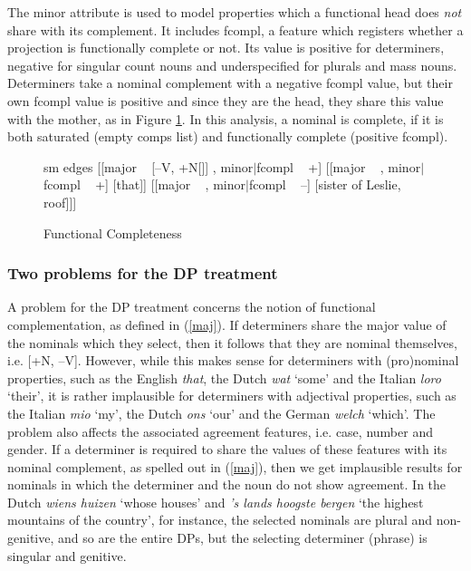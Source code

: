 \documentclass[output=paper]{langsci/langscibook}
\begin{document}
The {\sc minor} attribute is used to model properties which a functional head does {\em not} share with its 
complement. It includes {\sc fcompl}, a feature which registers whether a projection is 
functionally complete or not. Its value is positive for determiners, negative for  
singular count nouns and underspecified for plurals and mass nouns.  
Determiners take a nominal complement with a negative {\sc fcompl} value, but their 
own {\sc fcompl} value is positive and since they are the head, they share this value with 
the mother, as in Figure \ref{netter}. 
In this analysis, a nominal is complete, if it is both saturated 
(empty {\sc comps} list) and functionally complete (positive {\sc fcompl}). 

\begin{figure}
	\centering
	\begin{forest}
sm edges
[{[{\sc major} ~  [--V, +N[]] , {\sc minor$|$fcompl} ~ +]}
		[{[{\sc major} ~  , {\sc minor$|$fcompl} ~ +]} [that]]
		[{[{\sc major} ~  , {\sc minor$|$fcompl} ~ --]} [sister of Leslie, roof]]]
	\end{forest}
	\caption{\label{netter} Functional Completeness }
\end{figure}


\subsubsection{Two problems for the DP treatment}  


A problem for the DP treatment concerns the notion of 
functional complementation, as defined in (\ref{maj}). 
If determiners share the {\sc major} value of the nominals which they select, 
then it follows that they are nominal themselves, i.e. [+N, --V].
However, while this makes sense for determiners with (pro)nominal properties,
such as the English \emph{that}, the Dutch \emph{wat} `some' and the Italian 
\emph{loro} `their', it is rather implausible for determiners with adjectival properties,
such as the Italian \emph{mio} `my', the Dutch \emph{ons} `our' and the German
\emph{welch} `which'.   
The problem also affects the associated agreement features, i.e. {\sc case}, 
{\sc number} and {\sc gender}. If a determiner 
is required to share the values of these features with its nominal complement,
as spelled out in (\ref{maj}), then we get implausible results for nominals in 
which the determiner and the noun do not show agreement.    
In the Dutch \emph{wiens huizen} `whose houses' and 
\emph{'s lands hoogste bergen} `the highest mountains of the country', for instance,  
the selected nominals are plural and non-genitive, and so are the entire DPs, but 
the selecting determiner (phrase) is singular and genitive. 
\end{document}
